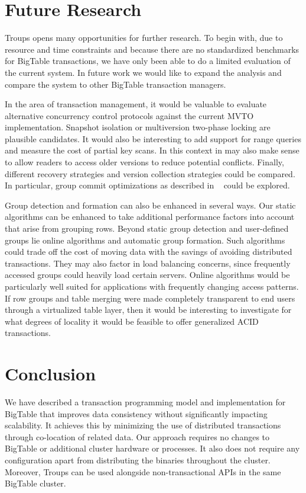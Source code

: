 \documentclass[10pt,final,journal]{IEEEtran}
\begin{document}
\section{Future Research}
Troups opens many opportunities for further research. To begin with, due to resource and time constraints and because there are no standardized benchmarks for BigTable transactions, we have only been able to do a limited evaluation of the current system. In future work we would like to expand the analysis and compare the system to other BigTable transaction managers.

In the area of transaction management, it would be valuable to evaluate alternative concurrency control protocols against the current MVTO implementation. Snapshot isolation or multiversion two-phase locking are plausible candidates. It would also be interesting to add support for range queries and measure the cost of partial key scans. In this context in may also make sense to allow readers to access older versions to reduce potential conflicts. Finally, different recovery strategies and version collection strategies could be compared. In particular, group commit optimizations as described in ~\cite{Weikum:2001:TIS} could be explored.

Group detection and formation can also be enhanced in several ways. Our static algorithms can be enhanced to take additional performance factors into account that arise from grouping rows. Beyond static group detection and user-defined groups lie online algorithms and automatic group formation. Such algorithms could trade off the cost of moving data with the savings of avoiding distributed transactions. They may also factor in load balancing concerns, since frequently accessed groups could heavily load certain servers. Online algorithms would be particularly well suited for applications with frequently changing access patterns. If row groups and table merging were made completely transparent to end users through a virtualized table layer, then it would be interesting to investigate for what degrees of locality it would be feasible to offer generalized ACID transactions.

\section{Conclusion}
We have described a transaction programming model and implementation for BigTable that improves data consistency without significantly impacting scalability. It achieves this by minimizing the use of distributed transactions through co-location of related data. Our approach requires no changes to BigTable or additional cluster hardware or processes. It also does not require any configuration apart from distributing the binaries throughout the cluster. Moreover, Troups can be used alongside non-transactional APIs in the same BigTable cluster.
\end{document}
